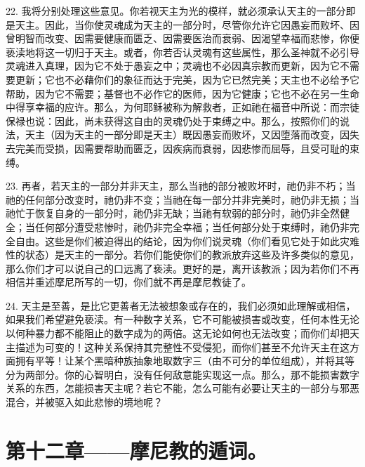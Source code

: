 22. 我将分别处理这些意见。你若视天主为光的模样，就必须承认天主的一部分即是天主。因此，当你使灵魂成为天主的一部分时，尽管你允许它因愚妄而败坏、因曾明智而改变、因需要健康而匮乏、因需要医治而衰弱、因渴望幸福而悲惨，你便亵渎地将这一切归于天主。或者，你若否认灵魂有这些属性，那么圣神就不必引导灵魂进入真理，因为它不处于愚妄之中；灵魂也不必因真宗教而更新，因为它不需要更新；它也不必藉你们的象征而达于完美，因为它已然完美；天主也不必给予它帮助，因为它不需要；基督也不必作它的医师，因为它健康；它也不必在另一生命中得享幸福的应许。那么，为何耶稣被称为解救者，正如祂在福音中所说：而宗徒保禄也说：因此，尚未获得这自由的灵魂仍处于束缚之中。那么，按照你们的说法，天主（因为天主的一部分即是天主）既因愚妄而败坏，又因堕落而改变，因失去完美而受损，因需要帮助而匮乏，因疾病而衰弱，因悲惨而屈辱，且受可耻的束缚。\par

23. 再者，若天主的一部分并非天主，那么当祂的部分被败坏时，祂仍非不朽；当祂的任何部分改变时，祂仍非不变；当祂在每一部分并非完美时，祂仍非无损；当祂忙于恢复自身的一部分时，祂仍非无缺；当祂有软弱的部分时，祂仍非全然健全；当任何部分遭受悲惨时，祂仍非完全幸福；当任何部分处于束缚时，祂仍非完全自由。这些是你们被迫得出的结论，因为你们说灵魂（你们看见它处于如此灾难性的状态）是天主的一部分。若你们能使你们的教派放弃这些及许多类似的意见，那么你们才可以说自己的口远离了亵渎。更好的是，离开该教派；因为若你们不再相信并重述摩尼所写的一切，你们就不再是摩尼教徒了。\par

24. 天主是至善，是比它更善者无法被想象或存在的，我们必须如此理解或相信，如果我们希望避免亵渎。有一种数字关系，它不可能被损害或改变，任何本性无论以何种暴力都不能阻止的数字成为的两倍。这无论如何也无法改变；而你们却把天主描述为可变的！这种关系保持其完整性不受侵犯，而你们甚至不允许天主在这方面拥有平等！让某个黑暗种族抽象地取数字三（由不可分的单位组成），并将其等分为两部分。你的心智明白，没有任何敌意能实现这一点。那么，那不能损害数字关系的东西，怎能损害天主呢？若它不能，怎么可能有必要让天主的一部分与邪恶混合，并被驱入如此悲惨的境地呢？\par


\section{第十二章——摩尼教的遁词。}

